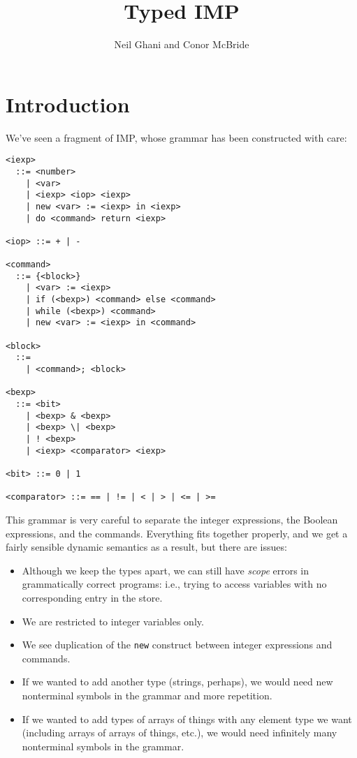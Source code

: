 \documentclass{article}
\begin{document}
\title{Typed IMP}
\author{Neil Ghani and Conor McBride}
\maketitle

\newcommand{\ass}{\;\mathtt{:=}\;}
\newcommand{\newe}[3]{\mathtt{new}\;#1\ass#2\;\mathtt{in}\;#3}
\newcommand{\newc}[3]{\mathtt{new}\;#1\ass#2\;\mathtt{in}\;#3}
\newcommand{\doe}[2]{\mathtt{do}\;#1\;\mathtt{return}\;#2}
\newcommand{\doret}[2]{\mathtt{do}\;#1\;\mathtt{return}\;#2}
\newcommand{\ifel}[3]{\mathtt{if}\;\mathtt{(}#1\mathtt{)}\;#2\;\mathtt{else}\;#3}
\newcommand{\whi}[2]{\mathtt{while}\; \mathtt{(}#1\mathtt{)} \;#2}
\newcommand{\ang}[1]{\langle #1 \rangle}
\newcommand{\NT}[1]{\ang{\mathit{#1}}}
\newcommand{\wk}[2]{#1 \backslash #2}
\newcommand{\fbx}[1]{\framebox{\ensuremath{#1}}}

\section{Introduction}

We've seen a fragment of IMP, whose grammar has been constructed with care:

\begin{verbatim}
<iexp>
  ::= <number>
    | <var>
    | <iexp> <iop> <iexp>
    | new <var> := <iexp> in <iexp>
    | do <command> return <iexp>

<iop> ::= + | -

<command>
  ::= {<block>}
    | <var> := <iexp>
    | if (<bexp>) <command> else <command>
    | while (<bexp>) <command>
    | new <var> := <iexp> in <command>

<block>
  ::=
    | <command>; <block>

<bexp>
  ::= <bit>
    | <bexp> & <bexp>
    | <bexp> \| <bexp>
    | ! <bexp>
    | <iexp> <comparator> <iexp>

<bit> ::= 0 | 1

<comparator> ::= == | != | < | > | <= | >=
\end{verbatim}

This grammar is very careful to separate the integer expressions, the Boolean expressions, and the commands. Everything fits together properly, and we get a fairly sensible dynamic semantics as a result, but there are issues:
\begin{itemize}
\item Although we keep the types apart, we can still have \emph{scope} errors in grammatically correct programs: i.e., trying to access variables with no corresponding entry in the store.
\item We are restricted to integer variables only.
\item We see duplication of the {\tt new} construct between integer expressions and commands.
\item If we wanted to add another type (strings, perhaps), we would need new nonterminal symbols in the grammar and more repetition.
\item If we wanted to add types of arrays of things with any element type we want (including arrays of arrays of things, etc.), we would need infinitely many nonterminal symbols in the grammar.
\end{itemize}
\end{document}
